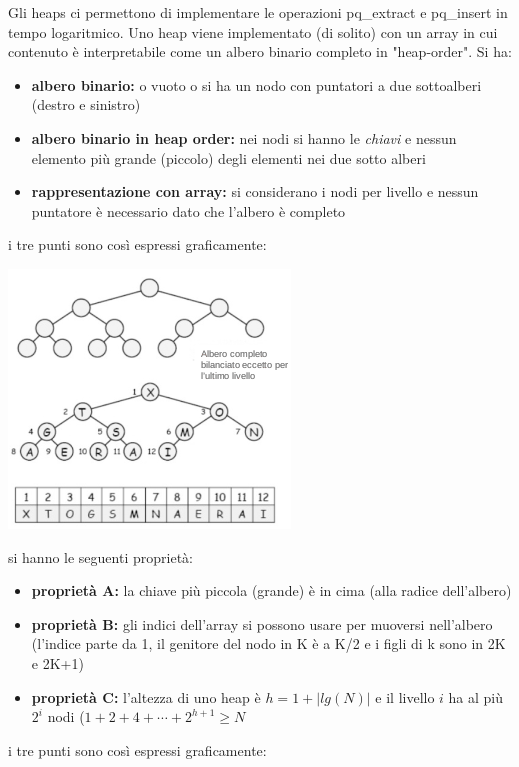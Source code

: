 \documentclass[a4paper,12pt, oneside]{book}
\begin{document}
Gli heaps ci permettono di implementare le operazioni pq\_extract e pq\_insert
in tempo logaritmico. Uno heap viene implementato (di solito) con un array in cui contenuto è
interpretabile come un albero binario completo in "heap-order". Si ha:
\begin{itemize}
\item \textbf{albero binario:} o vuoto o si ha un nodo con puntatori a due sottoalberi
(destro e sinistro)
\item \textbf{albero binario in heap order:} nei nodi si hanno le \textit{chiavi} e nessun elemento più grande (piccolo)
degli elementi nei due sotto alberi
\item \textbf{rappresentazione con array:} si considerano i nodi per livello e nessun puntatore è necessario dato
che l'albero è completo
\end{itemize}
i tre punti sono così espressi graficamente:
\begin{center}
\includegraphics[scale=3]{img/c7.png}
\end{center}
si hanno le seguenti proprietà:
\begin{itemize}
\item \textbf{proprietà A:} la chiave più piccola
(grande) è in cima (alla radice
dell'albero)
\item \textbf{proprietà B:} gli indici dell'array si
possono usare per muoversi
nell'albero (l'indice parte da 1, il genitore del nodo in K è a K/2 e i figli di k sono in 2K e 2K+1)
\item \textbf{proprietà C:} l'altezza di uno heap è $h=1+|lg(N)|$ e il livello $i$ ha al più $2^i$ nodi ($1+2+4+\cdots+2^{h+1}\geq N$
\end{itemize}
i tre punti sono così espressi graficamente:
\end{document}
